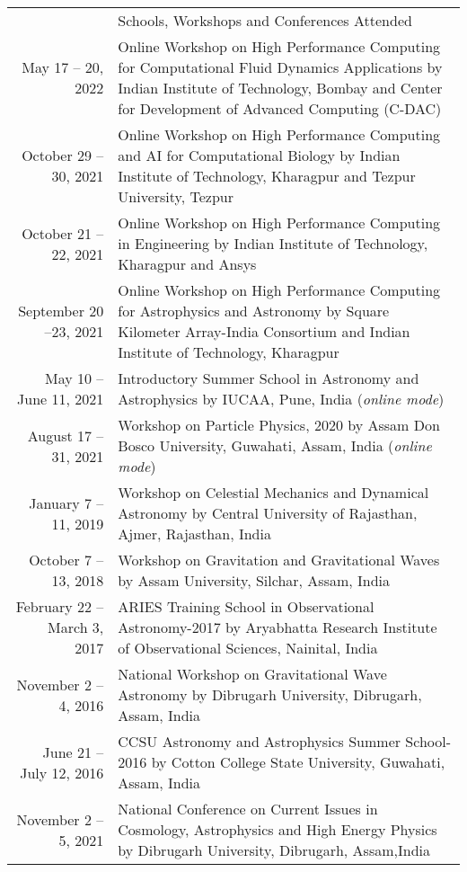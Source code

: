 \documentclass[a4paper, 11pt]{article}
\newcommand{\headingfont}{\Large\color{Peach}}
\newenvironment{SectionTable}[1]{
	\renewcommand*{\arraystretch}{1.7}
	\setlength{\tabcolsep}{10pt}
	\begin{longtable}{Rp{5.2in}} & #1 \\}
{\end{longtable}\vspace{-.3cm}}
\begin{document}
\begin{SectionTable}{\headingfont Schools, Workshops and Conferences Attended}
May 17 -- 20, 2022 & 
Online Workshop on High Performance Computing for Computational Fluid Dynamics Applications by Indian Institute of Technology, Bombay and Center for Development of Advanced Computing (C-DAC)
 \\

October 29 -- 30, 2021 & 
Online Workshop on High Performance Computing and AI for Computational Biology by Indian Institute of Technology, Kharagpur and Tezpur University, Tezpur
 \\
October 21 -- 22, 2021 & 
Online Workshop on High Performance Computing in Engineering by Indian Institute of Technology, Kharagpur and Ansys
 \\
 
September 20 --23, 2021 & 
Online Workshop on High Performance Computing for Astrophysics and Astronomy by Square Kilometer Array-India Consortium and Indian Institute of Technology, Kharagpur
 \\

May 10 -- June 11, 2021 &
Introductory Summer School in Astronomy and Astrophysics by IUCAA, Pune, India (\textit{online mode})
\\

August 17 --31, 2021 &
Workshop on Particle Physics, 2020 by Assam Don Bosco University, Guwahati, Assam, India (\textit{online mode})
\\

January 7 --11, 2019 &
Workshop on Celestial Mechanics and Dynamical Astronomy by Central University of Rajasthan, Ajmer, Rajasthan, India
\\

October 7 --13, 2018 &
Workshop on Gravitation and Gravitational Waves by Assam University, Silchar, Assam, India
\\

February 22 -- March 3, 2017 &
ARIES Training School in Observational Astronomy-2017 by Aryabhatta Research Institute of Observational Sciences, Nainital, India
\\

November 2 -- 4, 2016 &
National Workshop on Gravitational Wave Astronomy by Dibrugarh University, Dibrugarh, Assam, India
\\

June 21 -- July 12, 2016 &
CCSU Astronomy and Astrophysics Summer School-2016 by Cotton College State University, Guwahati, Assam, India
\\

November 2 -- 5, 2021 &
National Conference on Current Issues in Cosmology, Astrophysics and High Energy Physics by Dibrugarh University, Dibrugarh, Assam,India
\\
\end{SectionTable}
\end{document}
